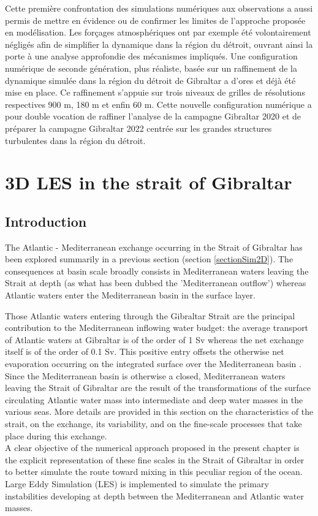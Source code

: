 Cette première confrontation des simulations numériques aux observations a aussi permis de mettre en évidence ou de confirmer les limites de l'approche proposée en modélisation. Les forçages atmosphériques ont par exemple été volontairement négligés afin de simplifier la dynamique dans la région du détroit, ouvrant ainsi la porte à une analyse approfondie des mécanismes impliqués. Une configuration numérique de seconde génération, plus réaliste, basée sur un raffinement de la dynamique simulée dans la région du détroit de Gibraltar a d'ores et déjà été mise en place. Ce raffinement s'appuie sur trois niveaux de grilles de résolutions respectives 900 m, 180 m et enfin 60 m. Cette nouvelle configuration numérique a pour double vocation de raffiner l'analyse de la campagne Gibraltar 2020 et de préparer la campagne Gibraltar 2022 centrée sur les grandes structures turbulentes dans la région du détroit.


\section{3D LES in the strait of Gibraltar}
\label{sectionSim3D}
\subsection{Introduction}

The Atlantic - Mediterranean exchange occurring in the Strait of Gibraltar has been explored summarily in a previous section (section \ref{sectionSim2D}). The consequences at basin scale broadly consists in Mediterranean waters leaving the Strait at depth (as what has been dubbed the 'Mediterranean outflow') whereas Atlantic waters enter the Mediterranean basin in the surface layer.

Those Atlantic waters entering through the Gibraltar Strait are the principal contribution to the Mediterranean inflowing water budget: the average transport of Atlantic waters at Gibraltar is of the order of 1 Sv whereas the net exchange itself is of the order of 0.1 Sv. This positive entry offsets the otherwise net evaporation occurring on the integrated surface over the Mediterranean basin \citep{Bryden94}.
Since the Mediterranean basin is otherwise a closed, Mediterranean waters leaving the Strait of Gibraltar are the result of the transformations of the surface circulating Atlantic water mass into intermediate and deep water masses in the various seas.
More details are provided in this section on the characteristics of the strait, on the exchange, its variability, and on the fine-scale processes that take place during this exchange.\\
A clear objective of the numerical approach proposed in the present chapter is the explicit representation of these fine scales in the Strait of Gibraltar in order to better simulate the route toward mixing in this peculiar region of the ocean. Large Eddy Simulation (LES) is implemented to simulate the primary instabilities developing at depth between the Mediterranean and Atlantic water masses.


